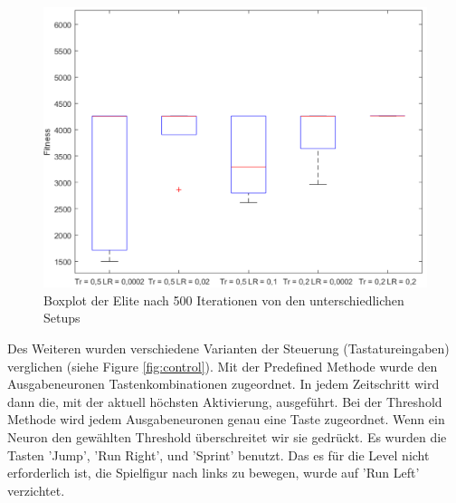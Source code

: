 \documentclass{hbrs-ecta-report}
\begin{document}
\begin{figure}[h!]
	\centering
	\includegraphics[width=\linewidth]{img/Mario_Treshold_boxplot.png}
	\caption{Boxplot der Elite nach 500 Iterationen von den unterschiedlichen Setups}
	\label{fig:treshold_boxplot} 
\end{figure}

\FloatBarrier

Des Weiteren wurden verschiedene Varianten der Steuerung (Tastatureingaben) verglichen (siehe Figure \ref{fig:control}).
Mit der Predefined Methode wurde den Ausgabeneuronen Tastenkombinationen zugeordnet. In jedem Zeitschritt wird dann die, mit der aktuell höchsten Aktivierung, ausgeführt.
Bei der Threshold Methode wird jedem Ausgabeneuronen genau eine Taste zugeordnet. Wenn ein Neuron den gewählten Threshold überschreitet wir sie gedrückt. \newline
Es wurden die Tasten 'Jump', 'Run Right', und 'Sprint' benutzt. Das es für die Level nicht erforderlich ist, die Spielfigur nach links zu bewegen, wurde auf 'Run Left' verzichtet. \newline
\end{document}
